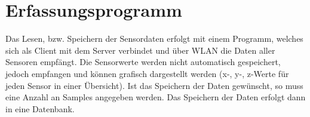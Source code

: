 \section{Erfassungsprogramm}
\label{kap:Erfassungsprogramm}
Das Lesen, bzw. Speichern der Sensordaten erfolgt mit einem Programm, welches sich als Client mit dem Server verbindet und über WLAN die Daten aller Sensoren empfängt. Die Sensorwerte werden nicht automatisch gespeichert, jedoch empfangen und können grafisch dargestellt werden (x-, y-, z-Werte für jeden Sensor in einer Übersicht). Ist das Speichern der Daten gewünscht, so muss eine Anzahl an Samples angegeben werden. Das Speichern der Daten erfolgt dann in eine Datenbank.




